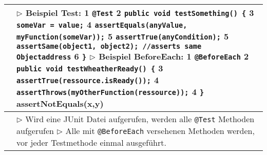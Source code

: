 \begin{table}[H]
\begin{tabular}{ | p{4cm} p{13.5cm} | }
	\makecell[l]{Beispiel} & 
	\makecell[l]
	{
	$\rhd$ Beispiel Test: \\
	\hspace{0.5cm} 1 \hspace{0.4cm} \texttt{@Test} \\
	\hspace{0.5cm} 2 \hspace{0.4cm} \texttt{public void testSomething() \{} \\
	\hspace{0.5cm} 3 \hspace{0.6cm} \texttt{someVar = value;} \\
	\hspace{0.5cm} 4 \hspace{0.6cm} \texttt{assertEquals(anyValue, myFunction(someVar));} \\
	\hspace{0.5cm} 5 \hspace{0.6cm} \texttt{assertTrue(anyCondition);} \\
	\hspace{0.5cm} 5 \hspace{0.6cm} \texttt{assertSame(object1, object2);  //asserts same Objectaddress} \\
	\hspace{0.5cm} 6 \hspace{0.4cm} \texttt{\}} \\
	$\rhd$ Beispiel BeforeEach: \\
	\hspace{0.5cm} 1 \hspace{0.4cm} \texttt{@BeforeEach} \\
	\hspace{0.5cm} 2 \hspace{0.4cm} \texttt{public void testWheatherReady() \{} \\
	\hspace{0.5cm} 3 \hspace{0.6cm} \texttt{assertTrue(ressource.isReady());} \\
	\hspace{0.5cm} 4 \hspace{0.4cm} \texttt{assertThrows(myOtherFunction(ressource));} \\
	\hspace{0.5cm} 4 \hspace{0.4cm} \texttt{\}} \\
	assertNotEquals(x,y)
	} 	\\ \hline


	\makecell[l]{Funktion} & 
	\makecell[l]
	{
	$\rhd$ Wird eine JUnit Datei aufgerufen, werden alle \texttt{@Test} Methoden aufgerufen \\
	$\rhd$ Alle mit \texttt{@BeforeEach} versehenen Methoden werden, \\ 
	\hspace{0.4cm} vor jeder Testmethode einmal ausgeführt. 
	} 	\\ \hline



\end{tabular}
\end{table}
